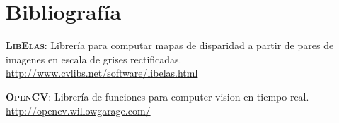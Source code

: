 \documentclass[journal,a4paper]{IEEEtran}
\newcommand{\tit}[1]{\textsc{\textbf{#1}}}
\begin{document}
\section{Bibliografía}

\tit{LibElas}: Librería para computar mapas de disparidad a partir de pares de imagenes en escala de grises rectificadas. \url{http://www.cvlibs.net/software/libelas.html}

\bigskip

\tit{OpenCV}: Librería de funciones para computer vision en tiempo real. \url{http://opencv.willowgarage.com/}
\end{document}
